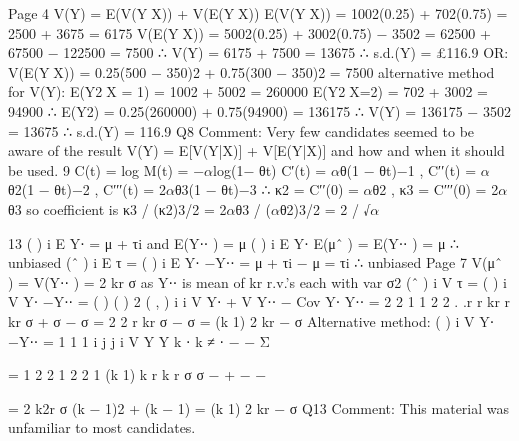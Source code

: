 \documentclass[a4paper,12pt]{article}
\begin{document}
Page 4
V(Y) = E(V(YX)) + V(E(YX))
E(V(YX)) = 1002(0.25) + 702(0.75)
= 2500 + 3675 = 6175
V(E(YX)) = 5002(0.25) + 3002(0.75) − 3502
= 62500 + 67500 − 122500 = 7500
∴ V(Y) = 6175 + 7500 = 13675
∴ s.d.(Y) = £116.9
OR: V(E(YX)) = 0.25(500 − 350)2 + 0.75(300 − 350)2 = 7500
alternative method for V(Y):
E(Y2X = 1) = 1002 + 5002 = 260000
E(Y2X=2) = 702 + 3002 = 94900
∴ E(Y2) = 0.25(260000) + 0.75(94900)
= 136175
∴ V(Y) = 136175 − 3502 = 13675
∴ s.d.(Y) = 116.9
Q8 Comment: Very few candidates seemed to be aware of the result V(Y) = E[V(Y|X)]
+ V[E(Y|X)] and how and when it should be used.
9 C(t) = log M(t) = −$\alpha$log(1− θt)
C′(t) = $\alpha$θ(1 − θt)−1 , C′′(t) = $\alpha$θ2(1 − θt)−2 , C′′′(t) = 2$\alpha$θ3(1 − θt)−3
∴ κ2 = C′′(0) = $\alpha$θ2 , κ3 = C′′′(0) = 2$\alpha$θ3 so coefficient is
κ3 / (κ2)3/2 = 2$\alpha$θ3 / ($\alpha$θ2)3/2 = 2 / √$\alpha$

13 ( ) i E Y⋅ = μ + τi and E(Y⋅⋅ ) = μ
( ) i E Y⋅ E(μˆ ) = E(Y⋅⋅ ) = μ ∴ unbiased
(ˆ ) i E τ = ( ) i E Y⋅ −Y⋅⋅ = μ + τi − μ = τi ∴ unbiased
Page 7
V(μˆ ) = V(Y⋅⋅ ) =
2
kr
σ
as Y⋅⋅ is mean of kr r.v.’s each with var σ2
(ˆ ) i V τ = ( ) i V Y⋅ −Y⋅⋅
= ( ) ( ) 2 ( , ) i i V Y⋅ + V Y⋅⋅ − Cov Y⋅ Y⋅⋅
=
2 2
1 1 2
2 . .r
r kr r kr
σ + σ − σ
=
2 2
r kr
σ − σ =
(k 1) 2
kr
− σ
\medskip 
Alternative method:
( ) i V Y⋅ −Y⋅⋅ =
1 1
1 i j
j i
V Y Y
k ⋅ k ≠ ⋅
    −  − Σ 
   
=
1 2 2 1 2 2
1 (k 1)
k r k r
 σ  σ
 −  + −  −
   
=
2
k2r
σ {(k − 1)2 + (k − 1)} =
(k 1) 2
kr
− σ
Q13 Comment: This material was unfamiliar to most candidates.
\end{document}
